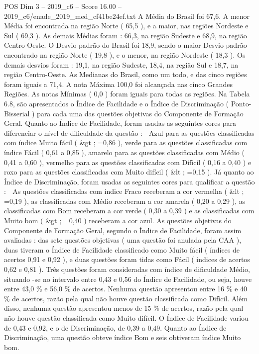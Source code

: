 \begin{textsample}{POS Dim 3 – 2019\_c6 – Score 16.00 – 2019\_c6/enade\_2019\_med\_cf41be24ef.txt}
A Média do Brasil foi 67,6.
A menor Média foi encontrada na região Norte ( 65,5 ), e a maior, nas regiões Nordeste e Sul ( 69,3 ).
As demais Médias foram : 66,3, na região Sudeste e 68,9, na região Centro-Oeste.
O Desvio padrão do Brasil foi 18,9, sendo o maior Desvio padrão encontrado na região Norte ( 19,8 ), e o menor, na região Nordeste ( 18,3 ).
Os demais desvios foram : 19,1, na região Sudeste, 18,4, na região Sul e 18,7, na região Centro-Oeste.
As Medianas do Brasil, como um todo, e das cinco regiões foram iguais a 71,4.
A nota Máxima 100,0 foi alcançada nas cinco Grandes Regiões.
As notas Mínimas ( 0,0 ) foram iguais para todas as regiões.
Na Tabela 6.8, são apresentados o Índice de Facilidade e o Índice de Discriminação ( Ponto-Bisserial ) para cada uma das questões objetivas do Componente de Formação Geral.
Quanto ao Índice de Facilidade, foram usadas as seguintes cores para diferenciar o nível de dificuldade da questão :  Azul para as questões classificadas com índice Muito fácil ( \&gt ; =0,86 ), verde para as questões classificadas com índice Fácil ( 0,61 a 0,85 ), amarelo para as questões classificadas com Médio ( 0,41 a 0,60 ), vermelho para as questões classificadas com Difícil ( 0,16 a 0,40 ) e roxo para as questões classificadas com Muito difícil ( \&lt ; =0,15 ).
Já quanto ao Índice de Discriminação, foram usadas as seguintes cores para qualificar a questão :  As questões classificadas com índice Fraco receberam a cor vermelha ( \&lt ; =0,19 ), as classificadas com Médio receberam a cor amarela ( 0,20 a 0,29 ), as classificadas com Bom receberam a cor verde ( 0,30 a 0,39 ) e as classificadas com Muito bom ( \&gt ; =0,40 ) receberam a cor azul.
As questões objetivas do Componente de Formação Geral, segundo o Índice de Facilidade, foram assim avaliadas : das sete questões objetivas ( uma questão foi anulada pela CAA ), duas tiveram o Índice de Facilidade classificado como Muito fácil ( índices de acertos 0,91 e 0,92 ), e duas questões foram tidas como Fácil ( índices de acertos 0,62 e 0,81 ).
Três questões foram consideradas com índice de dificuldade Médio, situando -se no intervalo entre 0,43 e 0,56 do Índice de Facilidade, ou seja, houve entre 43,0 \% e 56,0 \% de acertos.
Nenhuma questão apresentou entre 16 \% e 40 \% de acertos, razão pela qual não houve questão classificada como Difícil.
Além disso, nenhuma questão apresentou menos de 15 \% de acertos, razão pela qual não houve questão classificada como Muito difícil.
O Índice de Facilidade variou de 0,43 e 0,92, e o de Discriminação, de 0,39 a 0,49.
Quanto ao Índice de Discriminação, uma questão obteve índice Bom e seis obtiveram índice Muito bom.

\end{textsample}
